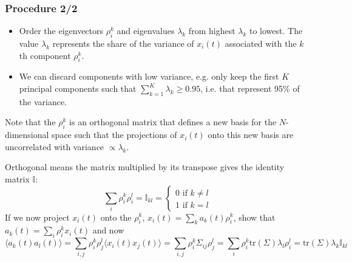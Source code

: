 \documentclass[10pt,aspectratio=169,dvipsnames]{beamer}
\let\olditem\item
\renewcommand{\item}{%
\olditem\vspace{5pt}}
\begin{document}
\begin{frame}
  \frametitle{Procedure 2/2}

  \begin{itemize}
      \item Order the eigenvectors $\rho^k_i$ and eigenvalues $\lambda_k$ from highest $\lambda_k$ to lowest. The value $\lambda_k$ represents the share of the variance of $x_i(t)$ associated with the $k$th component $\rho^k_i$.
    \item We can discard components with low variance, e.g. only keep the first $K$ \alert{principal components} such that $\sum_{k=1}^K\lambda_k \geq  0.95$, i.e. that represent 95\% of the variance.
  \end{itemize}

  Note that the $\rho^k_i$ is an orthogonal matrix  that defines a new basis for the $N$-dimensional space such that the projections of $x_i(t)$ onto this new basis are uncorrelated with variance $\propto\lambda_k$.

  Orthogonal means the matrix multiplied by its transpose gives the identity matrix $\mathbb{I}$:
  \begin{equation*}
    \sum_i \rho^k_i \rho^l_i = \mathbb{I}_{kl} = \left\{\begin{array}{lr} 0 \text{ if } k \neq l \\ 1  \text{ if } k = l \end{array} \right.
  \end{equation*}
  If we now project $x_i(t)$ onto the $\rho^k_i$, $x_i(t) = \sum_k a_k(t) \rho^k_i$, show that $a_k(t) = \sum_i  \rho^k_i x_i(t)$ and now
  \begin{equation*}
    \langle a_k(t) a_l(t) \rangle = \sum_{i,j}\rho^k_i \rho^l_j \langle x_i(t) x_j(t) \rangle  = \sum_{i,j}\rho^k_i    \Sigma_{ij} \rho^l_j =  \sum_{i}\rho^k_i \textrm{tr}(\Sigma) \lambda_l \rho^l_i = \textrm{tr}(\Sigma) \lambda_k \mathbb{I}_{kl}
  \end{equation*}

\end{frame}
\end{document}
